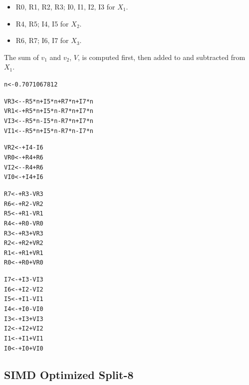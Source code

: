 \documentclass[a4paper]{report}
\begin{document}
\begin{itemize}
	\item R0, R1, R2, R3; I0, I1, I2, I3 for $X_1$.
	\item R4, R5; I4, I5 for $X_2$.
	\item R6, R7; I6, I7 for $X_3$.
\end{itemize}

	The sum of $v_1$ and $v_2$, $V$, is computed first, then added to and subtracted from $X_1$.
\begin{alltt}
\centering
n   <- 0.7071067812            \,

VR3 <- -R5*n +I5*n +R7*n +I7*n \,
VR1 <- +R5*n +I5*n -R7*n +I7*n \,
VI3 <- -R5*n -I5*n -R7*n +I7*n \,
VI1 <- -R5*n +I5*n -R7*n -I7*n \,

VR2 <- +I4   -I6               \,
VR0 <- +R4   +R6               \,
VI2 <- -R4   +R6               \,
VI0 <- +I4   +I6               \,

R7  <- +R3 -VR3                \,
R6  <- +R2 -VR2                \,
R5  <- +R1 -VR1                \,
R4  <- +R0 -VR0                \,
R3  <- +R3 +VR3                \,
R2  <- +R2 +VR2                \,
R1  <- +R1 +VR1                \,
R0  <- +R0 +VR0                \,

I7  <- +I3 -VI3                \,
I6  <- +I2 -VI2                \,
I5  <- +I1 -VI1                \,
I4  <- +I0 -VI0                \,
I3  <- +I3 +VI3                \,
I2  <- +I2 +VI2                \,
I1  <- +I1 +VI1                \,
I0  <- +I0 +VI0                \,
\end{alltt}

\subsection{SIMD Optimized Split-8} \indent
\end{document}
